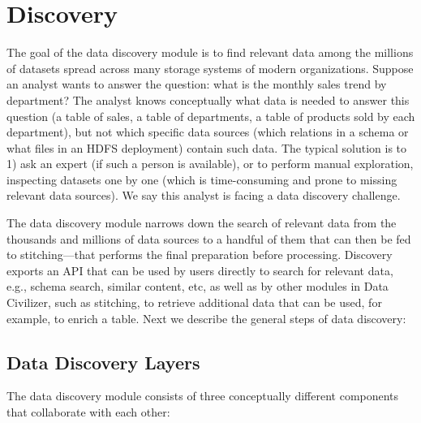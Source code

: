\section{Discovery}
\label{sec:discovery}

The goal of the data discovery module is to find relevant data among the
millions of datasets spread across many storage systems of modern organizations.
Suppose an analyst wants to answer the question: what is the monthly sales trend
by department? The analyst knows conceptually what data is needed to answer this
question (a table of sales, a table of departments, a table of products sold by
each department), but not which specific data sources (which relations in a
schema or what files in an HDFS deployment) contain such data. The typical
solution is to 1) ask an expert (if such a person is available), or to perform
manual exploration, inspecting datasets one by one (which is time-consuming and
prone to missing relevant data sources). We say this analyst is facing a data
discovery challenge.

The data discovery module narrows down the search of relevant data from the
thousands and millions of data sources to a handful of them that can then be fed
to stitching---that performs the final preparation before processing. Discovery
exports an API that can be used by users directly to search for relevant data,
e.g., schema search, similar content, etc, as well as by other modules in Data
Civilizer, such as stitching, to retrieve additional data that can be used, for
example, to enrich a table. Next we describe the general steps of data
discovery:

\subsection{Data Discovery Layers}

The data discovery module consists of three conceptually different components
that collaborate with each other:

